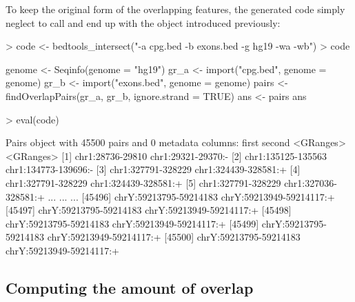 \documentclass[10pt]{article}
\begin{document}
To keep the original form of the overlapping features, the generated
code simply neglect to call  and end up with the
 object introduced previously:
\begin{Schunk}
\begin{Sinput}
> code <- bedtools_intersect("-a cpg.bed -b exons.bed -g hg19 -wa -wb")
> code
\end{Sinput}
\begin{Soutput}
{
    genome <- Seqinfo(genome = "hg19")
    gr_a <- import("cpg.bed", genome = genome)
    gr_b <- import("exons.bed", genome = genome)
    pairs <- findOverlapPairs(gr_a, gr_b, ignore.strand = TRUE)
    ans <- pairs
    ans
}
\end{Soutput}
\begin{Sinput}
> eval(code)
\end{Sinput}
\begin{Soutput}
Pairs object with 45500 pairs and 0 metadata columns:
                           first                   second
                       <GRanges>                <GRanges>
      [1]       chr1:28736-29810       chr1:29321-29370:-
      [2]     chr1:135125-135563     chr1:134773-139696:-
      [3]     chr1:327791-328229     chr1:324439-328581:+
      [4]     chr1:327791-328229     chr1:324439-328581:+
      [5]     chr1:327791-328229     chr1:327036-328581:+
      ...                    ...                      ...
  [45496] chrY:59213795-59214183 chrY:59213949-59214117:+
  [45497] chrY:59213795-59214183 chrY:59213949-59214117:+
  [45498] chrY:59213795-59214183 chrY:59213949-59214117:+
  [45499] chrY:59213795-59214183 chrY:59213949-59214117:+
  [45500] chrY:59213795-59214183 chrY:59213949-59214117:+
\end{Soutput}
\end{Schunk}

\subsection{Computing the amount of overlap}
\end{document}

